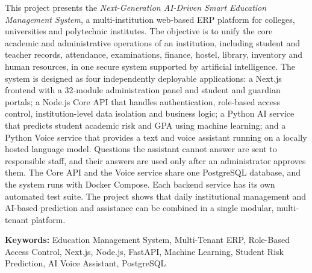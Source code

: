 This project presents the \textit{Next-Generation AI-Driven Smart Education Management System}, a multi-institution web-based ERP platform for colleges, universities and polytechnic institutes. The objective is to unify the core academic and administrative operations of an institution, including student and teacher records, attendance, examinations, finance, hostel, library, inventory and human resources, in one secure system supported by artificial intelligence. The system is designed as four independently deployable applications: a Next.js frontend with a 32-module administration panel and student and guardian portals; a Node.js Core API that handles authentication, role-based access control, institution-level data isolation and business logic; a Python AI service that predicts student academic risk and GPA using machine learning; and a Python Voice service that provides a text and voice assistant running on a locally hosted language model. Questions the assistant cannot answer are sent to responsible staff, and their answers are used only after an administrator approves them. The Core API and the Voice service share one PostgreSQL database, and the system runs with Docker Compose. Each backend service has its own automated test suite. The project shows that daily institutional management and AI-based prediction and assistance can be combined in a single modular, multi-tenant platform.

\vspace{8pt}
\textbf{Keywords:} Education Management System, Multi-Tenant ERP, Role-Based Access Control, Next.js, Node.js, FastAPI, Machine Learning, Student Risk Prediction, AI Voice Assistant, PostgreSQL

